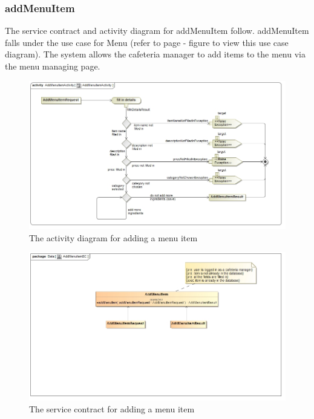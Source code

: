 \documentclass[a4paper,12pt]{article}
\begin{document}
 \subsubsection{addMenuItem}
The service contract and activity diagram for addMenuItem follow. addMenuItem falls under the use case for Menu (refer to page   - figure   to view this use case diagram). The system allows the cafeteria manager to add items to the menu via the menu managing page.
\begin{figure}[H]
  \centering
    \includegraphics[width=1.0\textwidth]{../images/AddMenuItemActivity.jpg}
    \caption{The activity diagram for adding a menu item } 
\end{figure}
\begin{figure}[H]
	\centering
	\includegraphics[width=1.0\textwidth]{../images/AddMenuItemSC.jpg}
	\caption{The service contract for adding a menu item}
\end{figure}
\end{document}

